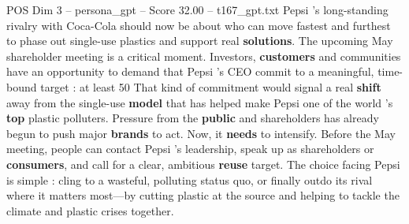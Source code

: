 \begin{textsample}{POS Dim 3 – persona\_gpt – Score 32.00 – t167\_gpt.txt}
Pepsi ’s long-standing rivalry with Coca-Cola should now be about who can move fastest and furthest to phase out single-use plastics and support real \textbf{solutions}.
The upcoming May shareholder meeting is a critical moment.
Investors, \textbf{customers} and communities have an opportunity to demand that Pepsi ’s CEO commit to a meaningful, time-bound target : at least 50 %
That kind of commitment would signal a real \textbf{shift} away from the single-use \textbf{model} that has helped make Pepsi one of the world ’s \textbf{top} plastic polluters.
Pressure from the \textbf{public} and shareholders has already begun to push major \textbf{brands} to act.
Now, it \textbf{needs} to intensify.
Before the May meeting, people can contact Pepsi ’s leadership, speak up as shareholders or \textbf{consumers}, and call for a clear, ambitious \textbf{reuse} target.
The choice facing Pepsi is simple : cling to a wasteful, polluting status quo, or finally outdo its rival where it matters most—by cutting plastic at the source and helping to tackle the climate and plastic crises together.

\end{textsample}
